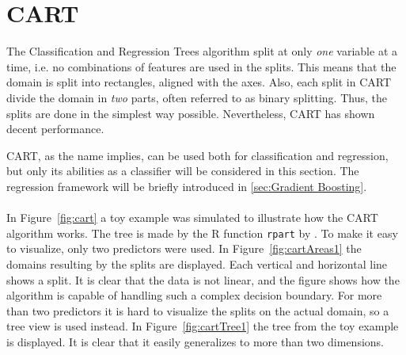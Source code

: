 \section{CART}
\label{sec:CART}
%
The Classification and Regression Trees algorithm split at only \textit{one} variable at a time, i.e. no combinations of features are used in the splits. This means that the domain is split into rectangles, aligned with the axes. 
Also, each split in CART divide the domain in \textit{two} parts, often referred to as binary splitting. Thus, the splits are done in the simplest way possible. Nevertheless, CART has shown decent performance. 

CART, as the name implies, can be used both for classification and regression, but only its abilities as a classifier will be considered in this section. The regression framework will be briefly introduced in \ref{sec:Gradient Boosting}.
\\
\\
In Figure~\ref{fig:cart} a toy example was simulated to illustrate how the CART algorithm works. The tree is made by the R function \verb+rpart+ by \cite{rpart}. To make it easy to visualize, only two predictors were used. 
In Figure~\ref{fig:cartAreas1} the domains resulting by the splits are displayed. Each vertical and horizontal line shows a split. It is clear that the data is not linear, and the figure shows how the algorithm is capable of handling such a complex decision boundary.
For more than two predictors it is hard to visualize the splits on the actual domain, so a tree view is used instead.
 In Figure~\ref{fig:cartTree1} the tree from the toy example is displayed. It is clear that it easily generalizes to more than two dimensions. \\
%
